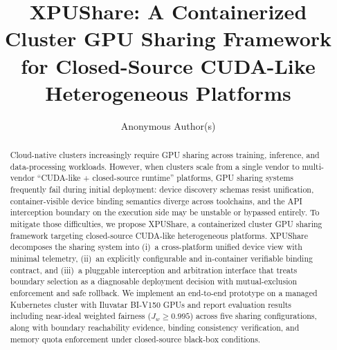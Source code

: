 \documentclass[runningheads,a4paper]{llncs}
\begin{document}
\title{XPUShare: A Containerized Cluster GPU Sharing Framework for Closed-Source CUDA-Like Heterogeneous Platforms}


\author{Anonymous Author(s)}
\institute{}

\maketitle

\begin{abstract}
Cloud-native clusters increasingly require GPU sharing across training,
inference, and data-processing workloads. However, when clusters scale
from a single vendor to multi-vendor ``CUDA-like + closed-source runtime''
platforms, GPU sharing systems frequently fail during initial deployment:
device discovery schemas resist unification, container-visible device
binding semantics diverge across toolchains, and the API interception
boundary on the execution side may be unstable or bypassed entirely. To mitigate those difficulties, we propose XPUShare, a containerized cluster GPU sharing framework targeting
closed-source CUDA-like heterogeneous platforms. XPUShare decomposes the
sharing system into (i)~a cross-platform unified device view with minimal
telemetry, (ii)~an explicitly configurable and in-container verifiable
binding contract, and (iii)~a pluggable interception and arbitration
interface that treats boundary selection as a diagnosable deployment
decision with mutual-exclusion enforcement and safe rollback. We
implement an end-to-end prototype on a managed Kubernetes cluster with
Iluvatar BI-V150 GPUs and report evaluation results including
near-ideal weighted fairness ($J_w{\geq}0.995$) across five sharing
configurations, along with boundary reachability evidence, binding
consistency verification, and memory quota enforcement under closed-source
black-box conditions.

\end{abstract}

\end{document}
